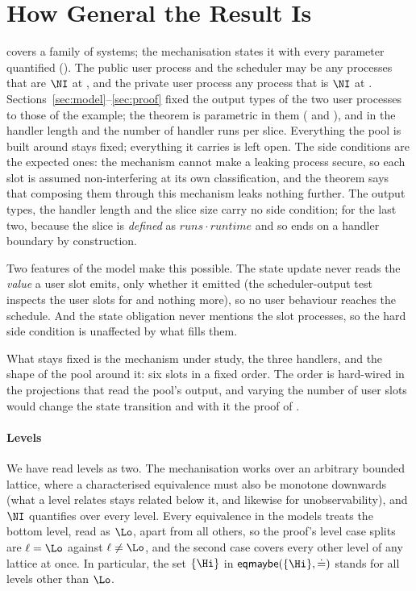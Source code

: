 \section{How General the Result Is}\label{sec:generality}

 covers a family of systems; the mechanisation states it with every
parameter quantified (). The public user process and the
scheduler may be any processes that are $\NI$ at , and the private
user process any process that is $\NI$ at .
Sections~\ref{sec:model}--\ref{sec:proof} fixed the output types of the two user
processes to those of the example; the theorem is parametric in them (
and ), and in the handler length  and the number
 of handler runs per slice. Everything the pool is built around stays
fixed; everything it carries is left open. The side conditions are the expected
ones: the mechanism cannot make a leaking process secure, so each slot is assumed
non-interfering at its own classification, and the theorem says that composing them
through this mechanism leaks nothing further. The output types, the handler length
and the slice size carry no side condition; for the last two, because the slice is
\emph{defined} as $\mathit{runs}\cdot\mathit{runtime}$ and so ends on a handler
boundary by construction.

Two features of the model make this possible. The state update never reads the
\emph{value} a user slot emits, only whether it emitted (the scheduler-output test
inspects the user slots for  and nothing more), so no user behaviour reaches
the schedule. And the state obligation  never mentions the slot processes, so
the hard side condition is unaffected by what fills them.

What stays fixed is the mechanism under study, the three handlers, and the shape of
the pool around it: six slots in a fixed order. The order is hard-wired in the
projections that read the pool's output, and varying the number of user slots would
change the state transition and with it the proof of .

\paragraph{Levels} We have read levels as two. The mechanisation works over an
arbitrary bounded lattice, where a characterised equivalence must also be monotone
downwards (what a level relates stays related below it, and likewise for
unobservability), and $\NI$ quantifies over every level. Every equivalence in the models
treats the bottom level, read as $\Lo$, apart from all others, so the proof's level
case splits are $\ell = \Lo$ against $\ell \neq \Lo$, and the second case covers every
other level of any lattice at once. In particular, the set $\{\Hi\}$ in
$\mathsf{eqmaybe}(\{\Hi\},\doteq)$ stands for all levels other than $\Lo$.
